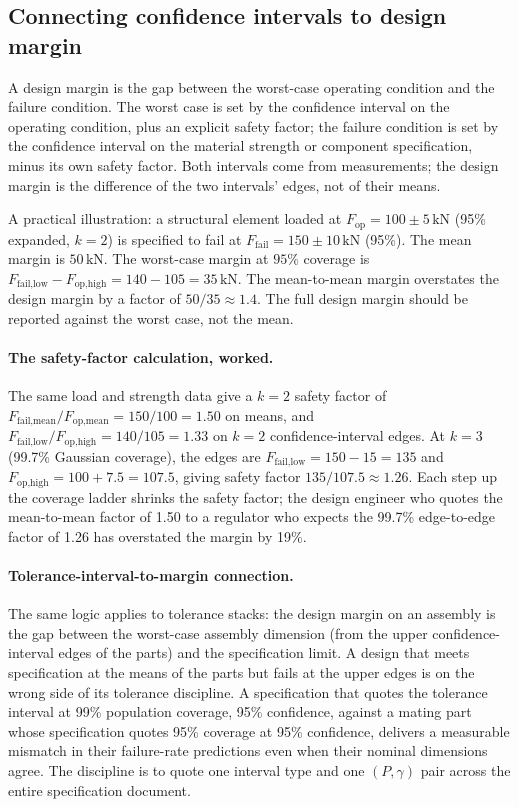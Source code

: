 \subsection{Connecting confidence intervals to design margin}

A design margin is the gap between the worst-case operating
condition and the failure condition. The worst case is set by the
confidence interval on the operating condition, plus an explicit
safety factor; the failure condition is set by the confidence
interval on the material strength or component specification, minus
its own safety factor. Both intervals come from measurements; the
design margin is the difference of the two intervals' edges, not
of their means.

A practical illustration: a structural element loaded at
$F_{\text{op}} = 100 \pm 5 \,\si{\kilo\newton}$ (95\% expanded,
$k = 2$) is specified to fail at $F_{\text{fail}} = 150 \pm 10
\,\si{\kilo\newton}$ (95\%). The mean margin is $50\,\si{\kilo
\newton}$. The worst-case margin at $95\%$ coverage is
$F_{\text{fail}, \text{low}} - F_{\text{op}, \text{high}} =
140 - 105 = 35\,\si{\kilo\newton}$. The mean-to-mean margin
overstates the design margin by a factor of $50/35 \approx 1.4$.
The full design margin should be reported against the worst case,
not the mean.

\paragraph{The safety-factor calculation, worked.} The same load
and strength data give a $k = 2$ safety factor of $F_{\text{fail},
\text{mean}}/F_{\text{op}, \text{mean}} = 150/100 = 1.50$ on means,
and $F_{\text{fail}, \text{low}}/F_{\text{op}, \text{high}} =
140/105 = 1.33$ on $k = 2$ confidence-interval edges. At $k = 3$
(99.7\% Gaussian coverage), the edges are $F_{\text{fail}, \text{low}}
= 150 - 15 = 135$ and $F_{\text{op}, \text{high}} = 100 + 7.5 =
107.5$, giving safety factor $135/107.5 \approx 1.26$. Each step
up the coverage ladder shrinks the safety factor; the design
engineer who quotes the mean-to-mean factor of 1.50 to a regulator
who expects the 99.7\% edge-to-edge factor of 1.26 has overstated
the margin by 19\%.

\paragraph{Tolerance-interval-to-margin connection.} The same logic
applies to tolerance stacks: the design margin on an assembly is
the gap between the worst-case assembly dimension (from the upper
confidence-interval edges of the parts) and the specification limit.
A design that meets specification at the means of the parts but
fails at the upper edges is on the wrong side of its tolerance
discipline. A specification that quotes the tolerance interval at
99\% population coverage, 95\% confidence, against a mating part
whose specification quotes 95\% coverage at 95\% confidence,
delivers a measurable mismatch in their failure-rate predictions
even when their nominal dimensions agree. The discipline is to
quote one interval type and one $(P, \gamma)$ pair across the entire
specification document.

